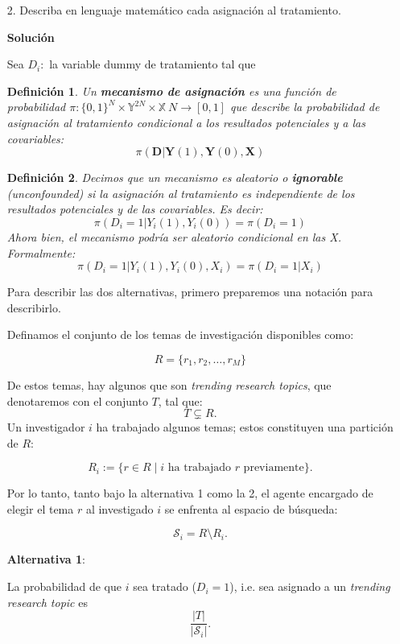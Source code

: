 \documentclass[a4paper, answers, addpoints, 11pt]{exam}
\newtheorem{definition}{Definición}
\newenvironment{solucion}{%
  \begin{mdframed}[
    backgroundcolor=blue!5,    %
    linecolor=blue!50,          %
    linewidth=2pt,              %
    leftmargin=10pt,            %
    rightmargin=8pt,           %
    topline=true,              %
    bottomline=true,            %
    roundcorner=10pt,           %
    innerleftmargin=10pt,       %
    innerrightmargin=10pt,      %
    innerbottommargin=10pt,     %
    innertopmargin=10pt         %
  ]%
  \begin{tcolorbox}[colframe=blue!50!black, colback=blue!50, coltitle=white, sharp corners=all, boxrule=1mm, width=\textwidth, halign=left, valign=center, top=0mm, bottom=0mm, left=0mm, right=0mm] \textbf{Solución} \end{tcolorbox} }{\end{mdframed}}
\begin{document}
\bigskip
\begin{itemize}
    \item[2.] Describa en lenguaje matemático cada asignación al tratamiento.

\begin{solucion}
    Sea $D_i:$ la variable dummy de tratamiento tal que 
       \begin{definition}
       \label{def:assignment_mechanism}
    Un \textbf{mecanismo de asignación} es una función de probabilidad $\pi: \{0,1\}^N\times \mathbb{Y}^{2N}\times\mathbb{X}~N\rightarrow[0,1]$ que describe la probabilidad de asignación al tratamiento condicional a los resultados potenciales y a las covariables:
    $$\pi(\mathbf{D} | \mathbf{Y}(1), \mathbf{Y}(0), \mathbf{X})$$
\end{definition}

\begin{definition}
    \label{def:ignorable}
    Decimos que un mecanismo es aleatorio o \textbf{ignorable} (\textit{unconfounded}) si la asignación al tratamiento es independiente de los resultados potenciales y de las covariables. Es decir:
  $$\pi(D_i = 1 | Y_i(1), Y_i(0)) = \pi(D_i = 1 )$$
    Ahora bien, el mecanismo podría ser aleatorio condicional en las X. Formalmente:
    $$\pi(D_i = 1 | Y_i(1), Y_i(0), X_i) = \pi(D_i = 1 | X_i)$$
\end{definition}




Para describir las dos alternativas, primero preparemos una notación para describirlo.

Definamos el conjunto de los temas de investigación disponibles como:

\[
R = \{r_1, r_2, \dots, r_M\}
\]

De estos temas, hay algunos que son \textit{trending research topics}, que denotaremos con el conjunto $T$, tal que:
\[
T \subsetneq R.
\]
Un investigador \( i \) ha trabajado algunos temas; estos constituyen una partición de \( R \):

\[
R_i := \{r \in R \mid i \text{ ha trabajado } r \text{ previamente} \}.
\]

Por lo tanto, tanto bajo la alternativa 1 como la 2, el agente encargado de elegir el tema \( r \) al investigado \( i \) se enfrenta al espacio de búsqueda:

\[
\mathcal{S}_i = R \setminus R_i.
\]


\textbf{Alternativa 1}:

La probabilidad de que $i$ sea tratado ($D_i=1$), i.e. sea asignado a un \textit{trending research topic} es 
\begin{equation}
    \frac{|T|}{|\mathcal{S}_i|}. \label{eq:alt1_prob}
\end{equation}


\end{solucion}
\end{itemize}
\end{document}
